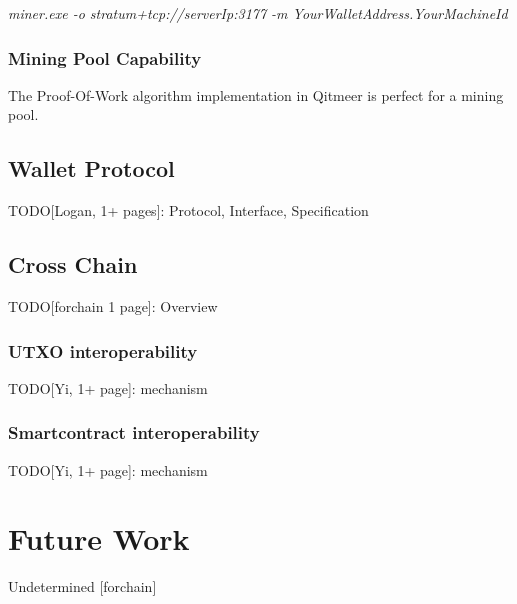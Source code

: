 \documentclass[a4paper,11pt]{article}
\begin{document}
\emph{miner.exe -o stratum+tcp://serverIp:3177 -m YourWalletAddress.YourMachineId}

\subsubsection{Mining Pool Capability}
The Proof-Of-Work algorithm implementation in Qitmeer is perfect for a mining pool.


\subsection{Wallet Protocol}
TODO[Logan, 1+ pages]: Protocol, Interface, Specification

\subsection{Cross Chain}
TODO[forchain 1 page]: Overview

\subsubsection{UTXO interoperability}
TODO[Yi, 1+ page]:  mechanism

\subsubsection{Smartcontract interoperability}
TODO[Yi, 1+ page]: mechanism

\section{Future Work}
Undetermined [forchain] 



\clearpage



%
%


\end{document}
